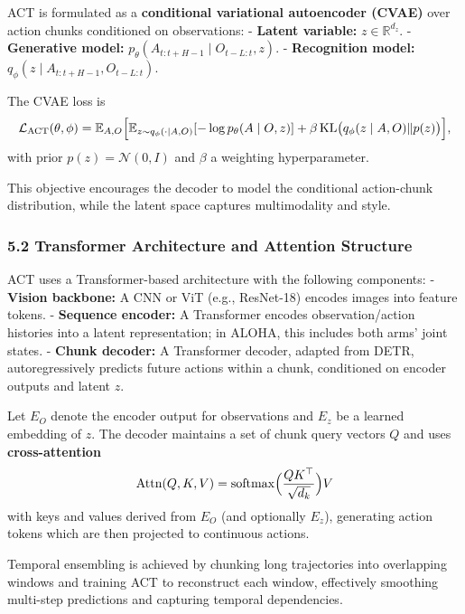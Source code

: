 \documentclass[
]{article}
\theoremstyle{remark}
\begin{document}
ACT is formulated as a \textbf{conditional variational autoencoder
(CVAE)} over action chunks conditioned on
observations: \cite{act-hf-summary,act2023} - \textbf{Latent variable:}
\(z \in \mathbb{R}^{d_z}\). - \textbf{Generative model:}
\(p_\theta(A_{t:t+H-1} \mid O_{t-L:t}, z)\). - \textbf{Recognition
model:} \(q_\phi(z \mid A_{t:t+H-1}, O_{t-L:t})\).

The CVAE loss is \[
\mathcal{L}_{\text{ACT}}(\theta, \phi) = \mathbb{E}_{A, O}\Bigl[ \mathbb{E}_{z \sim q_\phi(\cdot\mid A,O)}[ - \log p_\theta(A\mid O, z)] + \beta \, \mathrm{KL}\bigl(q_\phi(z\mid A,O) \Vert p(z)\bigr) \Bigr],
\] with prior \(p(z) = \mathcal{N}(0, I)\) and \(\beta\) a weighting
hyperparameter. \cite{act2023,act-hf-summary}

This objective encourages the decoder to model the conditional
action-chunk distribution, while the latent space captures multimodality
and style. \cite{act-hf-summary,act2023}

\subsubsection{5.2 Transformer Architecture and Attention
Structure}\label{transformer-architecture-and-attention-structure}

ACT uses a Transformer-based architecture with the following
components: \cite{act2023,act-project-page,act-hf-summary} - \textbf{Vision
backbone:} A CNN or ViT (e.g., ResNet-18) encodes images into feature
tokens. - \textbf{Sequence encoder:} A Transformer encodes
observation/action histories into a latent representation; in ALOHA,
this includes both arms' joint states. \cite{act-project-page,act2023} -
\textbf{Chunk decoder:} A Transformer decoder, adapted from DETR,
autoregressively predicts future actions within a chunk, conditioned on
encoder outputs and latent \(z\). \cite{act-project-page}

Let \(E_O\) denote the encoder output for observations and \(E_z\) be a
learned embedding of \(z\). The decoder maintains a set of chunk query
vectors \(Q\) and uses \textbf{cross-attention} \[
\text{Attn}(Q, K, V) = \operatorname{softmax}\Bigl(\frac{QK^\top}{\sqrt{d_k}}\Bigr) V
\] with keys and values derived from \(E_O\) (and optionally \(E_z\)),
generating action tokens which are then projected to continuous
actions. \cite{act-hf-summary,act-project-page}

Temporal ensembling is achieved by chunking long trajectories into
overlapping windows and training ACT to reconstruct each window,
effectively smoothing multi-step predictions and capturing temporal
dependencies. \cite{act2023,act-hf-summary}
\end{document}
